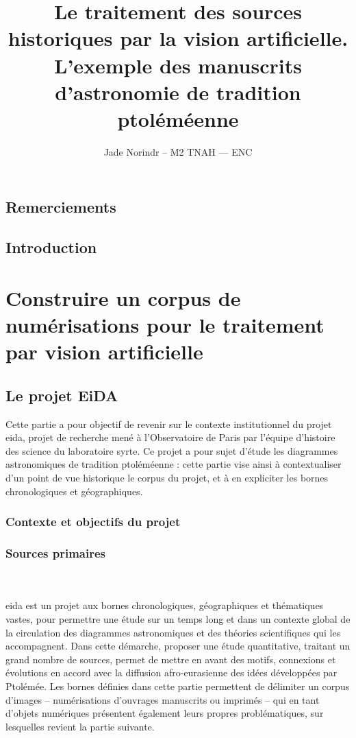 \documentclass[a4paper,12pt,twoside]{book}
\author{Jade Norindr – M2 TNAH — ENC}
\title{Le traitement des sources historiques par la vision artificielle. L'exemple des manuscrits d'astronomie de tradition ptoléméenne}
\newcommand{\eida}{\gls{eida}\xspace}
\newcommand{\clearemptydoublepage}{\newpage{\pagestyle{empty}\cleardoublepage}}
\newcommand\chapterNo[1]{
  \chapter*{#1}
  \markright{\MakeUppercase{#1}}
}
\begin{document}
\onehalfspacing 

\frontmatter

    

    \thispagestyle{empty}	
    \cleardoublepage
	
    
	
    \chapterNo{Remerciements}

    \printbibliography

    \chapterNo{Introduction}

    \thispagestyle{empty}
    \cleardoublepage

\mainmatter

    \part{Construire un corpus de numérisations pour le traitement par vision artificielle}
        \chapter{Le projet EiDA}
        Cette partie a pour objectif de revenir sur le contexte institutionnel du projet \eida, projet de recherche mené à l'Observatoire de Paris par l'équipe d'histoire des science du laboratoire \acrshort{syrte}. Ce projet a pour sujet d'étude les diagrammes astronomiques de tradition ptoléméenne : cette partie vise ainsi à contextualiser d'un point de vue historique le corpus du projet, et à en expliciter les bornes chronologiques et géographiques.
        
                \section{Contexte et objectifs du projet}
                    

                \section{Sources primaires}
                    
		\\
		\\
		\eida est un projet aux bornes chronologiques, géographiques et thématiques vastes, pour permettre une étude sur un temps long et dans un contexte global de la circulation des diagrammes astronomiques et des théories scientifiques qui les accompagnent. Dans cette démarche, proposer une étude quantitative, traitant un grand nombre de sources, permet de mettre en avant des motifs, connexions et évolutions en accord avec la diffusion afro-eurasienne des idées développées par Ptolémée. Les bornes définies dans cette partie permettent de délimiter un corpus d'images -- numérisations d'ouvrages manuscrits ou imprimés -- qui en tant d'objets numériques présentent également leurs propres problématiques, sur lesquelles revient la partie suivante.
        \clearemptydoublepage
        
\end{document}
